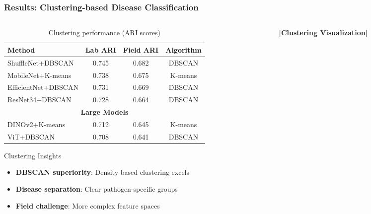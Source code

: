 \documentclass[aspectratio=43]{beamer}
\begin{document}
\begin{frame}
    \frametitle{Results: Clustering-based Disease Classification}
    
    \begin{columns}
        \begin{column}{0.5\textwidth}
            \begin{table}[h]
                \centering
                \caption{Clustering performance (ARI scores)}
                \scriptsize
                \begin{tabular}{lccc}
                \toprule
                \textbf{Method} & \textbf{Lab ARI} & \textbf{Field ARI} & \textbf{Algorithm} \\
                \midrule
                ShuffleNet+DBSCAN & 0.745 & 0.682 & DBSCAN \\
                MobileNet+K-means & 0.738 & 0.675 & K-means \\
                EfficientNet+DBSCAN & 0.731 & 0.669 & DBSCAN \\
                ResNet34+DBSCAN & 0.728 & 0.664 & DBSCAN \\
                \midrule
                \multicolumn{4}{c}{\textbf{Large Models}} \\
                DINOv2+K-means & 0.712 & 0.645 & K-means \\
                ViT+DBSCAN & 0.708 & 0.641 & DBSCAN \\
                \bottomrule
                \end{tabular}
            \end{table}
            
            \begin{alertblock}{Clustering Insights}
                \begin{itemize}
                    \item \textbf{DBSCAN superiority}: Density-based clustering excels
                    \item \textbf{Disease separation}: Clear pathogen-specific groups
                    \item \textbf{Field challenge}: More complex feature spaces
                \end{itemize}
            \end{alertblock}
        \end{column}
        
        \begin{column}{0.5\textwidth}
            \begin{center}
                \textbf{[Clustering Visualization]}
                

\end{center}
\end{column}
\end{columns}
\end{frame}
\end{document}
